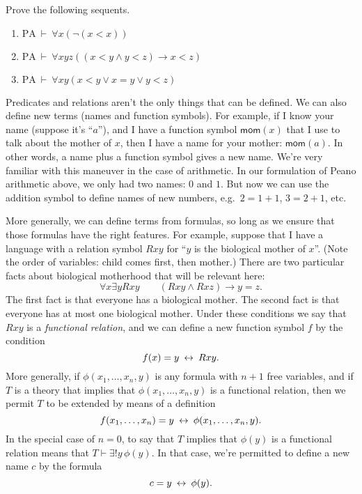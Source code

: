 \begin{exercise} Prove the following sequents.
  \begin{enumerate}
  \item $\text{PA}\:\vdash\:\forall x(\neg (x<x))$
  \item $\text{PA}\:\vdash\:\forall xyz((x<y\wedge y<z)\to x<z)$
  \item $\text{PA}\:\vdash\:\forall xy(x<y\vee x=y\vee
    y<z)$ \end{enumerate}
\end{exercise}

Predicates and relations aren't the only things that can be defined.
We can also define new terms (names and function symbols).  For
example, if I know your name (suppose it's ``$a$''), and I have a
function symbol $\mathsf{mom}(x)$ that I use to talk about the mother
of $x$, then I have a name for your mother: $\mathsf{mom}(a)$.  In
other words, a name plus a function symbol gives a new name.  We're
very familiar with this maneuver in the case of arithmetic.  In our
formulation of Peano arithmetic above, we only had two names: $0$ and
$1$.  But now we can use the addition symbol to define names of new
numbers, e.g.\ $2=1+1$, $3=2+1$, etc.

More generally, we can define terms from formulas, so long as we
ensure that those formulas have the right features.  For example,
suppose that I have a language with a relation symbol $Rxy$ for ``$y$
is the biological mother of $x$''.  (Note the order of variables:
child comes first, then mother.)  There are two particular facts
about biological motherhood that will be relevant here:
\[ \forall x\exists yRxy \qquad (Rxy\wedge Rxz)\to y=z .\]
The first fact is that everyone has a biological mother.  The second
fact is that everyone has at most one biological mother.  Under these
conditions we say that $Rxy$ is a \emph{functional relation}, and we
can define a new function symbol $f$ by the condition
\[ f(x)=y \: \leftrightarrow \: Rxy .\] More generally, if
$\phi (x_1,\dots ,x_n,y)$ is any formula with $n+1$ free variables,
and if $T$ is a theory that implies that $\phi (x_1,\dots ,x_n,y)$ is
a functional relation, then we permit $T$ to be extended by means of a
definition
\[ f(x_1,\dots ,x_n)=y \: \leftrightarrow \: \phi (x_1,\dots ,x_n,y) .\]
In the special case of $n=0$, to say that $T$ implies that $\phi (y)$
is a functional relation means that $T\vdash \exists !y\,\phi (y)$.
In that case, we're permitted to define a new name $c$ by the formula
\[ c=y \: \leftrightarrow \: \phi (y) .\]

